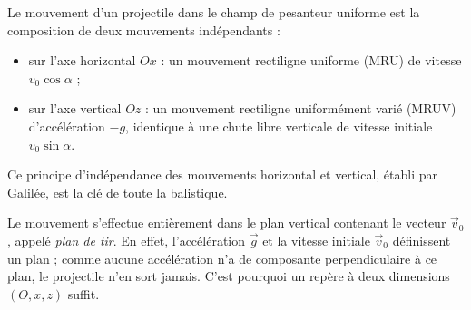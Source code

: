 \documentclass[11pt]{article}
\newcommand{\cle}[1]{{\popxbold\color{popdark}#1}}
\begin{document}
\begin{propriete}
Le mouvement d'un projectile dans le champ de pesanteur uniforme est la \cle{composition} de deux mouvements indépendants :
\begin{itemize}
\item sur l'axe horizontal $Ox$ : un \cle{mouvement rectiligne uniforme} (MRU) de vitesse $v_0\cos\alpha$ ;
\item sur l'axe vertical $Oz$ : un \cle{mouvement rectiligne uniformément varié} (MRUV) d'accélération $-g$, identique à une chute libre verticale de vitesse initiale $v_0\sin\alpha$.
\end{itemize}
Ce principe d'\cle{indépendance des mouvements} horizontal et vertical, établi par Galilée, est la clé de toute la balistique.
\end{propriete}

\begin{propriete}
Le mouvement s'effectue entièrement dans le \cle{plan vertical contenant le vecteur $\vec{v}_0$}, appelé \emph{plan de tir}. En effet, l'accélération $\vec{g}$ et la vitesse initiale $\vec{v}_0$ définissent un plan ; comme aucune accélération n'a de composante perpendiculaire à ce plan, le projectile n'en sort jamais. C'est pourquoi un repère à deux dimensions $(O, x, z)$ suffit.
\end{propriete}
\end{document}
